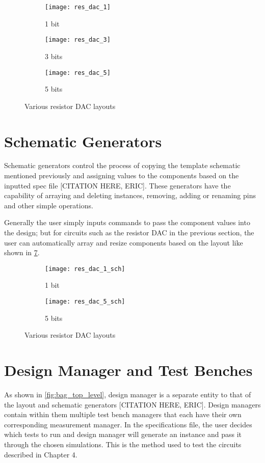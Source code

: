\begin{figure}[h]
\centering
\begin{subfigure}{.4\linewidth}
  \centering
  \texttt{[image: res\_dac\_1]}
  \caption{1 bit}
  \label{fig:sfig1}
\end{subfigure}
\begin{subfigure}{.4\linewidth}
  \centering
\texttt{[image: res\_dac\_3]}
  \caption{3 bits}
  \label{fig:sfig2}
\end{subfigure}
\begin{subfigure}{.5\linewidth}
  \centering
\texttt{[image: res\_dac\_5]}
  \caption{5 bits}
  \label{fig:sfig2}
\end{subfigure}
\caption{Various resistor DAC layouts}
\label{fig:dac}
\end{figure}
\clearpage
\section{Schematic Generators}
Schematic generators control the process of copying the template schematic mentioned previously and assigning values to the components based on the inputted spec file [CITATION HERE, ERIC]. These generators have the capability of arraying and deleting instances, removing, adding or renaming pins and other simple operations.

Generally the user simply inputs commands to pass the component values into the design; but for circuits such as the resistor DAC in the previous section, the user can automatically array and resize components based on the layout like shown in \ref{fig:resdac_sch}. 
\begin{figure}[h]
\centering
\begin{subfigure}{.5\linewidth}
  \centering
  \texttt{[image: res\_dac\_1\_sch]}
  \caption{1 bit}
  \label{fig:sfig1}
\end{subfigure}
\begin{subfigure}{0.6\linewidth}
  \centering
\texttt{[image: res\_dac\_5\_sch]}
  \caption{5 bits}
  \label{fig:sfig2}
\end{subfigure}
\caption{Various resistor DAC layouts}
\label{fig:resdac_sch}
\end{figure}
\clearpage
\section{Design Manager and Test Benches}
As shown in \ref{fig:bag_top_level}, design manager is a separate entity to that of the layout and schematic generators [CITATION HERE, ERIC]. Design managers contain within them multiple test bench managers that each have their own corresponding measurement manager. In the specifications file, the user decides which tests to run and design manager will generate an instance and pass it through the chosen simulations. This is the method used to test the circuits described in Chapter 4. 

